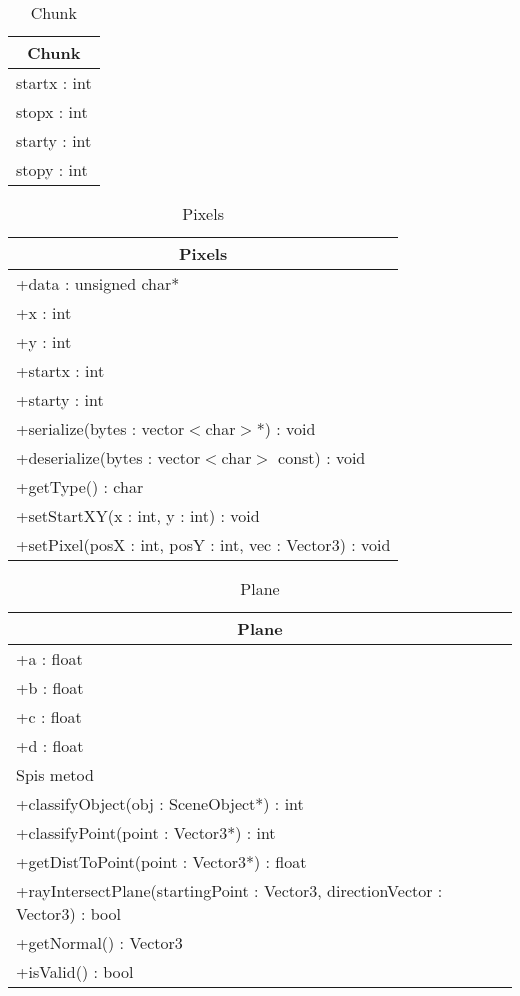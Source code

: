 \begin{longtable}{|p{16cm}|}
    \caption{Chunk} \label{tab:Chunk} \\ \hline
    \multicolumn{1}{|c|}{Chunk} \\ \hline
    startx : int \\
    stopx : int \\
    starty : int \\
    stopy : int \\
    \hline
\end{longtable}


\begin{longtable}{|p{16cm}|}
    \caption{Pixels} \label{tab:Pixels} \\ \hline
    \multicolumn{1}{|c|}{Pixels} \\ \hline
    +data : unsigned char* \\
    +x : int \\
    +y : int \\ 
    +startx : int \\
    +starty : int \\
    \hline
	+serialize(bytes : vector$<$char$>$*) : void \\
	+deserialize(bytes : vector$<$char$>$ const) : void \\
	+getType() : char \\
	+setStartXY(x : int, y : int) : void \\
	+setPixel(posX : int, posY : int, vec : Vector3) : void \\
	\hline
\end{longtable}

\begin{longtable}{|p{16cm}|}
    \caption{Plane} \label{tab:Plane} \\ \hline
    \multicolumn{1}{|c|}{Plane} \\ \hline
    +a : float \\ 
    +b : float \\
    +c : float \\
    +d : float \\
    \hline
	Spis metod \\ 
	+classifyObject(obj : SceneObject*) : int \\
	+classifyPoint(point : Vector3*) : int \\
	+getDistToPoint(point : Vector3*) : float \\
	+rayIntersectPlane(startingPoint : Vector3, directionVector : Vector3) : bool \\
	+getNormal() : Vector3 \\
	+isValid() : bool \\
	\hline
\end{longtable}

